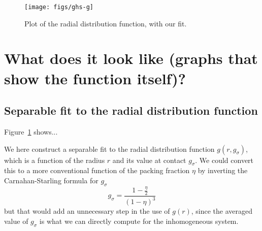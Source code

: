 \documentclass[letterpaper,twocolumn,amsmath,amssymb,pre,aps,10pt]{revtex4-1}
\begin{document}
\begin{figure}
  \centering
  \texttt{[image: figs/ghs-g]}%
  \caption{Plot of the radial distribution function, with our fit.}\label{fig:radial-distribution}
\end{figure}
\section{What does it look like (graphs that show the function itself)?}
\subsection{Separable fit to the radial distribution function}
Figure~\ref{fig:radial-distribution} shows...

We here construct a separable fit to the radial distribution function
$g(r, g_\sigma)$, which is a function of the radius $r$ and its value
at contact $g_\sigma$.  We could convert this to a more conventional
function of the packing fraction $\eta$ by inverting the
Carnahan-Starling formula for $g_\sigma$
\begin{equation}
  g_\sigma = \frac{1-\tfrac{\eta}{2}}{(1-\eta)^3}
\end{equation}
but that would add an unnecessary step in the use of $g(r)$, since the
averaged value of $g_\sigma$ is what we can directly compute for the
inhomogeneous system.
\end{document}

